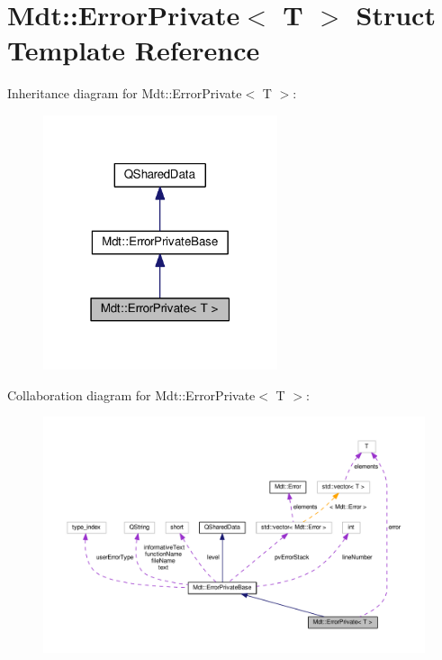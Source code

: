 \hypertarget{struct_mdt_1_1_error_private}{}\section{Mdt\+:\+:Error\+Private$<$ T $>$ Struct Template Reference}
\label{struct_mdt_1_1_error_private}


Inheritance diagram for Mdt\+:\+:Error\+Private$<$ T $>$\+:\nopagebreak
\begin{figure}[H]
\begin{center}
\leavevmode
\includegraphics[width=195pt]{struct_mdt_1_1_error_private__inherit__graph}
\end{center}
\end{figure}


Collaboration diagram for Mdt\+:\+:Error\+Private$<$ T $>$\+:\nopagebreak
\begin{figure}[H]
\begin{center}
\leavevmode
\includegraphics[width=350pt]{struct_mdt_1_1_error_private__coll__graph}
\end{center}
\end{figure}
